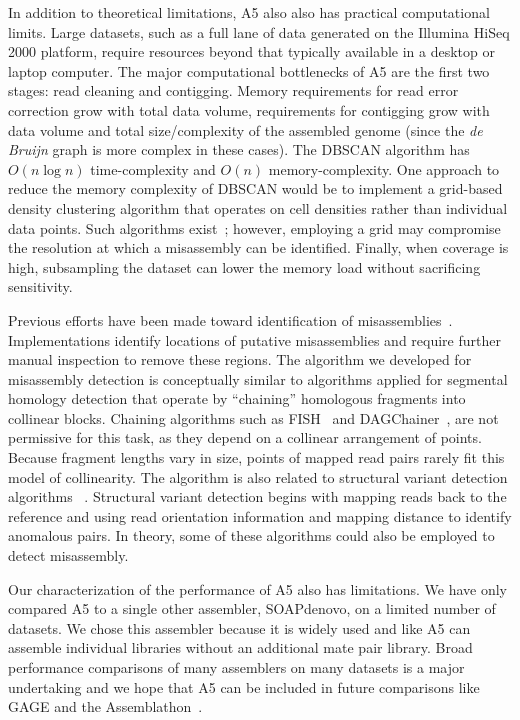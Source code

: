 \documentclass[10pt]{article}
\begin{document}
In addition to theoretical limitations, A5 also also has practical computational limits. Large datasets, such as a full lane of data
generated on the Illumina HiSeq 2000 platform, require resources beyond that typically available in a desktop or laptop computer. 
The major computational bottlenecks of A5 are the first two stages: read cleaning and contigging. Memory requirements for read error
correction grow with total data volume, requirements for contigging grow with data volume and total size/complexity of the assembled genome 
(since the \textit{de Bruijn} graph is more complex in these cases).
The DBSCAN algorithm has $O(n\log{n})$ time-complexity and $O(n)$ memory-complexity. One 
approach to reduce the memory complexity of DBSCAN would be to implement a grid-based density clustering algorithm that operates on cell densities 
rather than individual data points. Such algorithms exist~\cite{STING}; however, employing a grid may compromise the resolution at which 
a misassembly can be identified. Finally, when coverage is high, subsampling the dataset can lower the memory load without sacrificing
sensitivity.

Previous efforts have been made toward identification of misassemblies~\cite{Phillippy2008}. Implementations identify locations of putative 
misassemblies and require further manual inspection to remove these regions. The algorithm we developed for misassembly detection is conceptually 
similar to algorithms applied for segmental homology detection that operate by ``chaining'' homologous fragments into collinear blocks. Chaining 
algorithms such as FISH~\cite{Calabrese2003} and DAGChainer~\cite{Haas2004}, are not permissive for this task, as they depend on a 
collinear arrangement of points. Because fragment lengths vary in size, points of mapped read pairs rarely fit this model of collinearity. The algorithm is also related to structural variant detection 
algorithms ~\cite{BreakDancer,SVDetect}. Structural variant detection begins with mapping reads back to the reference and using read orientation 
information and mapping distance to identify anomalous pairs. In theory, some of these algorithms could also be employed to detect misassembly.  

Our characterization of the performance of A5 also has limitations. We have only compared A5 to a single other assembler, SOAPdenovo, on a limited number of datasets. We chose this assembler because it is widely used and like A5 can assemble individual libraries without an additional mate pair library.
Broad performance comparisons of many assemblers on many datasets is a major undertaking and we hope that A5 can be included in future comparisons like GAGE and the Assemblathon~\cite{Earl2011,Salzberg2011}.
\end{document}
